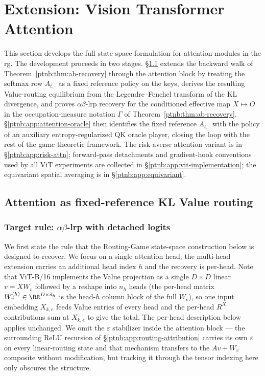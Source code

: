\section{Extension: Vision Transformer Attention}\label{ptnb:app:vit-extension}\label{sec:attention_routing_game}\label{ptnb:app:attention-subgame}

This section develops the full state-space formulation for attention modules in the \ac{rg}. The
development proceeds in two stages. \S\ref{ptnb:app:attention-kl-routing} extends the backward walk of
Theorem~\ref{ptnb:thm:ab-recovery} through the attention block by treating the softmax row $A_{t,\cdot}$
as a fixed reference policy on the keys, derives the resulting Value-routing equilibrium from the
Legendre--Fenchel transform of the KL divergence, and proves $\alpha\beta$-\ac{lrp} recovery for
the conditioned effective map $X \mapsto O$ in the occupation-measure notation $\Gamma$ of
Theorem~\ref{ptnb:thm:ab-recovery}. \S\ref{ptnb:app:attention-oracle} then identifies the fixed reference
$A_{t,\cdot}$ with the policy of an auxiliary entropy-regularized QK oracle player, closing the
loop with the rest of the game-theoretic framework. The risk-averse attention variant is in
\S\ref{ptnb:app:risk-attn}; forward-pass detachments and gradient-hook conventions used by all ViT
experiments are collected in \S\ref{ptnb:app:vit-implementation}; the equivariant spatial averaging is
in \S\ref{ptnb:app:equivariant}.

\subsection{Attention as fixed-reference KL Value routing}\label{ptnb:app:attention-kl-routing}

\subsubsection{Target rule: \texorpdfstring{$\alpha\beta$-\ac{lrp}}{LRP-alpha-beta} with detached logits}\label{ptnb:app:attention-target-rule}

We first state the rule that the Routing-Game state-space construction below is designed to
recover. We focus on a single attention head; the multi-head extension carries an additional head
index $h$ and the recovery is per-head. Note that ViT-B/16 implements the Value projection as a
single $D \times D$ linear $v = X W_v$ followed by a reshape into $n_h$ heads (the per-head matrix
$W_v^{(h)} \in \RR^{D \times d_h}$ is the head-$h$ column block of the full $W_v$), so one input
embedding $X_{k,e}$ feeds Value entries of every head and the per-head $R^X$ contributions sum at
$X_{k,e}$ to give the total. The per-head description below applies unchanged. We omit the
$\varepsilon$ stabilizer inside the attention block --- the surrounding ReLU recursion of
\S\ref{ptnb:app:routing-attribution} carries its own $\varepsilon$ on every linear-routing state and
that mechanism transfers to the $Av{+}W_v$ composite without modification, but tracking it through
the tensor indexing here only obscures the structure.

